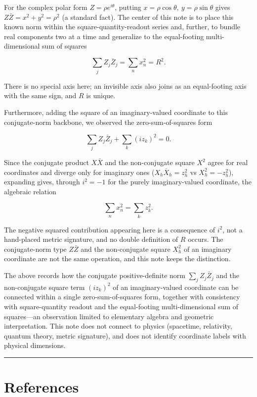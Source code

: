 \documentclass[11pt,a4paper]{article}
\begin{document}
For the complex polar form \(Z=\rho e^{i\theta}\), putting
\(x=\rho\cos\theta,\ y=\rho\sin\theta\) gives \(Z\bar Z=x^2+y^2=\rho^2\)
(a standard fact). The center of this note is to place this known norm
within the square-quantity-readout series and, further, to bundle real
components two at a time and generalize to the equal-footing
multi-dimensional sum of squares

\[
\sum_j Z_j\bar Z_j=\sum_n x_n^2=R^2 .
\]

There is no special axis here; an invisible axis also joins as an
equal-footing axis with the same sign, and \(R\) is unique.

Furthermore, adding the square of an imaginary-valued coordinate to this
conjugate-norm backbone, we observed the zero-sum-of-squares form

\[
\sum_j Z_j\bar Z_j+\sum_k (i z_k)^2=0 .
\]

Since the conjugate product \(X\bar X\) and the non-conjugate square
\(X^2\) agree for real coordinates and diverge only for imaginary ones
(\(X_h\bar X_h=z_h^2\) vs \(X_h^2=-z_h^2\)), expanding gives, through
\(i^2=-1\) for the purely imaginary-valued coordinate, the algebraic
relation

\[
\sum_{n} x_n^2=\sum_{k} z_k^2 .
\]

The negative squared contribution appearing here is a consequence of
\(i^2\), not a hand-placed metric signature, and no double definition of
\(R\) occurs. The conjugate-norm type \(Z\bar Z\) and the non-conjugate
square \(X_h^2\) of an imaginary coordinate are not the same operation,
and this note keeps the distinction.

The above records how the conjugate positive-definite norm
\(\sum_j Z_j\bar Z_j\) and the non-conjugate square term \((i z_k)^2\)
of an imaginary-valued coordinate can be connected within a single
zero-sum-of-squares form, together with consistency with square-quantity
readout and the equal-footing multi-dimensional sum of squares---an
observation limited to elementary algebra and geometric interpretation.
This note does not connect to physics (spacetime, relativity, quantum
theory, metric signature), and does not identify coordinate labels with
physical dimensions.

\begin{center}\rule{0.5\linewidth}{0.5pt}\end{center}

\section{References}\label{references}
\end{document}
